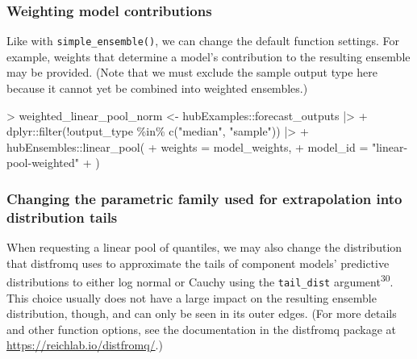\documentclass[
  letterpaper,
  DIV=11,
  numbers=noendperiod]{scrartcl}
\newenvironment{Shaded}{\begin{snugshade}}{\end{snugshade}}
\newcommand{\AttributeTok}[1]{\textcolor[rgb]{0.40,0.45,0.13}{#1}}
\newcommand{\FunctionTok}[1]{\textcolor[rgb]{0.28,0.35,0.67}{#1}}
\newcommand{\NormalTok}[1]{\textcolor[rgb]{0.00,0.23,0.31}{#1}}
\newcommand{\OtherTok}[1]{\textcolor[rgb]{0.00,0.23,0.31}{#1}}
\newcommand{\SpecialCharTok}[1]{\textcolor[rgb]{0.37,0.37,0.37}{#1}}
\newcommand{\StringTok}[1]{\textcolor[rgb]{0.13,0.47,0.30}{#1}}
\begin{document}
\subsubsection{Weighting model
contributions}\label{weighting-model-contributions-1}

Like with \texttt{simple\_ensemble()}, we can change the default
function settings. For example, weights that determine a model's
contribution to the resulting ensemble may be provided. (Note that we
must exclude the sample output type here because it cannot yet be
combined into weighted ensembles.)

\begin{Shaded}
\begin{Highlighting}[]
\SpecialCharTok{\textgreater{}}\NormalTok{   weighted\_linear\_pool\_norm }\OtherTok{\textless{}{-}}\NormalTok{ hubExamples}\SpecialCharTok{::}\NormalTok{forecast\_outputs }\SpecialCharTok{|\textgreater{}}
\SpecialCharTok{+}\NormalTok{     dplyr}\SpecialCharTok{::}\FunctionTok{filter}\NormalTok{(}\SpecialCharTok{!}\NormalTok{output\_type }\SpecialCharTok{\%in\%} \FunctionTok{c}\NormalTok{(}\StringTok{"median"}\NormalTok{, }\StringTok{"sample"}\NormalTok{)) }\SpecialCharTok{|\textgreater{}}
\SpecialCharTok{+}\NormalTok{     hubEnsembles}\SpecialCharTok{::}\FunctionTok{linear\_pool}\NormalTok{(}
\SpecialCharTok{+}       \AttributeTok{weights =}\NormalTok{ model\_weights,}
\SpecialCharTok{+}       \AttributeTok{model\_id =} \StringTok{"linear{-}pool{-}weighted"}
\SpecialCharTok{+}\NormalTok{     )}
\end{Highlighting}
\end{Shaded}

\subsubsection{Changing the parametric family used for extrapolation
into distribution
tails}\label{changing-the-parametric-family-used-for-extrapolation-into-distribution-tails}

When requesting a linear pool of quantiles, we may also change the
distribution that {distfromq} uses to approximate the tails of component
models' predictive distributions to either log normal or Cauchy using
the \texttt{tail\_dist} argument\textsuperscript{30}. This choice
usually does not have a large impact on the resulting ensemble
distribution, though, and can only be seen in its outer edges. (For more
details and other function options, see the documentation in the
{distfromq} package at \url{https://reichlab.io/distfromq/}.)
\end{document}
